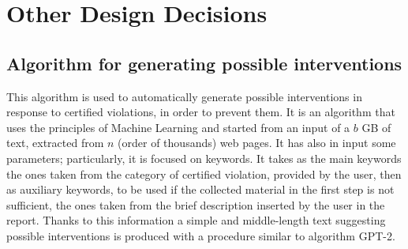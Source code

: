 \section{Other Design Decisions}
\subsection{Algorithm for generating possible interventions}
This algorithm is used to automatically generate possible interventions in response to certified violations, in order to 
prevent them. It is an algorithm that uses the principles of Machine Learning and started from an input of a $b$ GB of text, 
extracted from $n$ (order of thousands) web pages. It has also in input some parameters; particularly, it is focused on 
keywords. It takes as the main keywords the ones taken from the category of certified violation, provided by the user, 
then as auxiliary keywords, to be used if the collected material in the first step is not sufficient, the ones taken from 
the brief description inserted by the user in the report. Thanks to this information a simple and middle-length text 
suggesting possible interventions is produced with a procedure similar to algorithm GPT-2.


